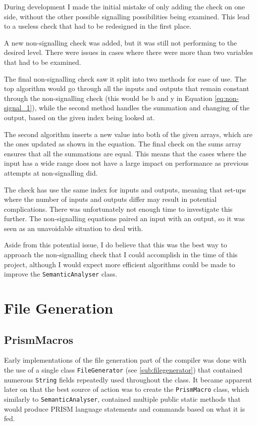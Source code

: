 \documentclass[report.tex]{subfiles}
\begin{document}
During development I made the initial mistake of only adding the check on one
side, without the other possible signalling possibilities being examined. This
lead to a useless check that had to be redesigned in the first place.

A new non-signalling check was added, but it was still not performing to the
desired level. There were issues in cases where there were more than two
variables that had to be examined.



The final non-signalling check saw it split into two methods for ease of use.
The top algorithm would go through all the inputs and outputs that remain
constant through the non-signalling check (this would be b and y in Equation
\ref{eq:non-signal_1}), while the second method handles the summation and
changing of the output, based on the given index being looked at.

The second algorithm inserts a new value into both of the given arrays, which
are the ones updated as shown in the equation. The final check on the sums
array ensures that all the summations are equal. This means that the cases where
the input has a wide range does not have a large impact on performance as
previous attempts at non-signalling did.

The check has use the same index for inputs and outputs, meaning that set-ups
where the number of inputs and outputs differ may result in potential
complications. There was unfortunately not enough time to investigate this
further. The non-signalling equations paired an input with an output, so it was
seen as an unavoidable situation to deal with.

Aside from this potential issue, I do believe that this was the best way to
approach the non-signalling check that I could accomplish in the time of this
project, although I would expect more efficient algorithms could be made to
improve the \texttt{SemanticAnalyser} class.

\section{File Generation} %
\label{sec:file_generation}
\subsection{PrismMacros} %
\label{sub:prismmacros}
Early implementations of the file generation part of the compiler was done with
the use of a single class \texttt{FileGenerator} (see \ref{sub:filegenerator})
that contained numerous \texttt{String} fields repeatedly used throughout the
class. It became apparent later on that the best source of action was to create
the \texttt{PrismMacro} class, which similarly to \texttt{SemanticAnalyser},
contained multiple public static methods that would produce PRISM language
statements and commands based on what it is fed.
\end{document}
